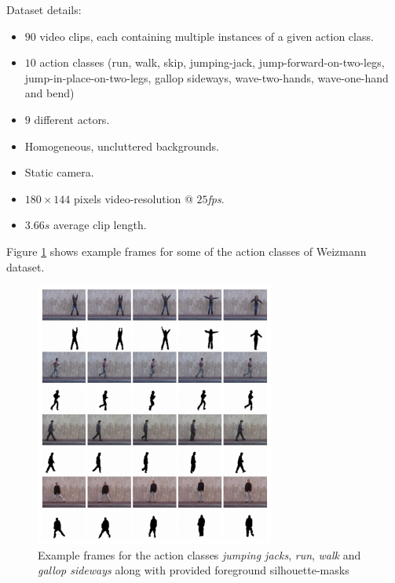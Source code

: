 Dataset details: \cite{kang_review_2016}
\begin{itemize}
    \item $90$ video clips, each containing multiple instances of a given action class.
    \item $10$ action classes (run, walk, skip, jumping-jack, jump-forward-on-two-legs, jump-in-place-on-two-legs, gallop sideways, wave-two-hands, wave-one-hand and bend) 
    \item $9$ different actors.
    \item Homogeneous, uncluttered backgrounds.
    \item Static camera.
    \item $180 \times 144$ pixels video-resolution @ $25$\textit{fps}.
    \item $3.66s$ average clip length.
\end{itemize}

Figure \ref{fig:weizmann_example} shows example frames for some of the action classes of Weizmann dataset.

\begin{figure}[H]
    \centering
    \includegraphics[width=0.7\textwidth]{img_datasets/weizmann_example}
    \caption{Example frames for the action classes \textit{jumping jacks}, \textit{run}, \textit{walk} and \textit{gallop sideways} along with provided foreground silhouette-masks \cite{blank_actions_2005}}
    \label{fig:weizmann_example}
\end{figure}


